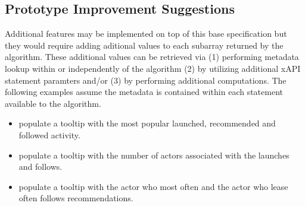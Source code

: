 \documentclass{article}
\begin{document}
\subsection{Prototype Improvement Suggestions}
Additional features may be implemented on top of this base
specification but they would require adding aditional values to each
subarray returned by the algorithm. These additional values can be
retrieved via (1) performing metadata lookup within or independently
of the algorithm (2) by utilizing additional xAPI statement paramters
and/or (3) by performing additional computations. The following
examples assume the metadata is contained within each statement
available to the algorithm.

\begin{itemize}
\item populate a tooltip with the most popular launched, recommended
  and followed activity.
\item populate a tooltip with the number of actors associated with the
  launches and follows.
\item populate a tooltip with the actor who most often and the actor
  who lease often follows recommendations.
\end{itemize}
\end{document}
